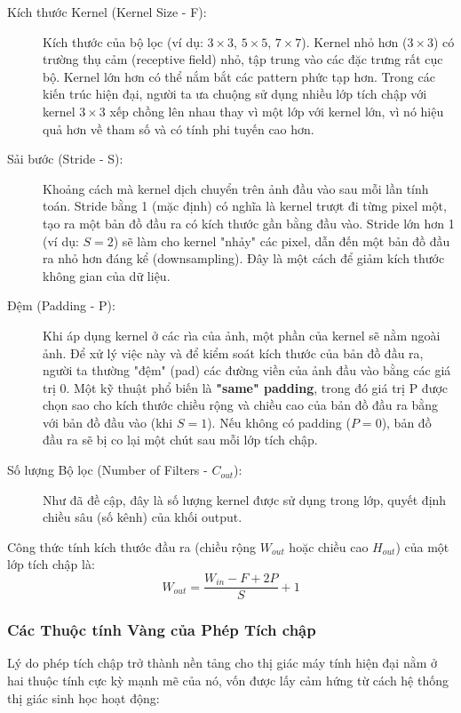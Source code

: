 \begin{description}
	\item[Kích thước Kernel (Kernel Size - F):] Kích thước của bộ lọc (ví dụ: $3 \times 3$, $5 \times 5$, $7 \times 7$). Kernel nhỏ hơn ($3 \times 3$) có trường thụ cảm (receptive field) nhỏ, tập trung vào các đặc trưng rất cục bộ. Kernel lớn hơn có thể nắm bắt các pattern phức tạp hơn. Trong các kiến trúc hiện đại, người ta ưa chuộng sử dụng nhiều lớp tích chập với kernel $3 \times 3$ xếp chồng lên nhau thay vì một lớp với kernel lớn, vì nó hiệu quả hơn về tham số và có tính phi tuyến cao hơn.
	
	\item[Sải bước (Stride - S):] Khoảng cách mà kernel dịch chuyển trên ảnh đầu vào sau mỗi lần tính toán. Stride bằng 1 (mặc định) có nghĩa là kernel trượt đi từng pixel một, tạo ra một bản đồ đầu ra có kích thước gần bằng đầu vào. Stride lớn hơn 1 (ví dụ: $S=2$) sẽ làm cho kernel "nhảy" các pixel, dẫn đến một bản đồ đầu ra nhỏ hơn đáng kể (downsampling). Đây là một cách để giảm kích thước không gian của dữ liệu.
	
	\item[Đệm (Padding - P):] Khi áp dụng kernel ở các rìa của ảnh, một phần của kernel sẽ nằm ngoài ảnh. Để xử lý việc này và để kiểm soát kích thước của bản đồ đầu ra, người ta thường "đệm" (pad) các đường viền của ảnh đầu vào bằng các giá trị 0. Một kỹ thuật phổ biến là \textbf{"same" padding}, trong đó giá trị P được chọn sao cho kích thước chiều rộng và chiều cao của bản đồ đầu ra bằng với bản đồ đầu vào (khi $S=1$). Nếu không có padding ($P=0$), bản đồ đầu ra sẽ bị co lại một chút sau mỗi lớp tích chập.
	
	\item[Số lượng Bộ lọc (Number of Filters - $C_{out}$):] Như đã đề cập, đây là số lượng kernel được sử dụng trong lớp, quyết định chiều sâu (số kênh) của khối output.
\end{description}

Công thức tính kích thước đầu ra (chiều rộng $W_{out}$ hoặc chiều cao $H_{out}$) của một lớp tích chập là:
\begin{equation}
	W_{out} = \frac{W_{in} - F + 2P}{S} + 1
\end{equation}

\subsubsection{Các Thuộc tính Vàng của Phép Tích chập}
\label{subsubsec:conv_properties}
Lý do phép tích chập trở thành nền tảng cho thị giác máy tính hiện đại nằm ở hai thuộc tính cực kỳ mạnh mẽ của nó, vốn được lấy cảm hứng từ cách hệ thống thị giác sinh học hoạt động:

